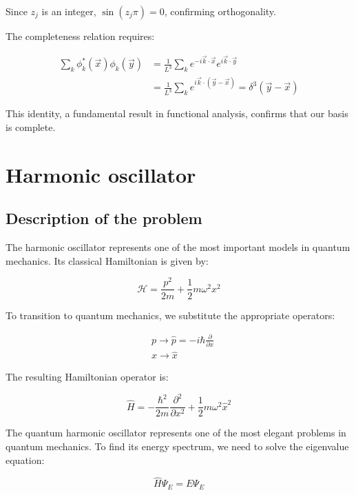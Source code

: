 \documentclass[italian]{HKNdocument}
\begin{document}
Since $z_j$ is an integer, $\sin(z_j\pi) = 0$, confirming orthogonality.

The completeness relation requires:

\begin{align}
\sum_k \phi_k^*(\vec{x})\phi_k(\vec{y}) &= \frac{1}{L^3}\sum_k e^{-i\vec{k}\cdot\vec{x}}e^{i\vec{k}\cdot\vec{y}} \\
&= \frac{1}{L^3}\sum_k e^{i\vec{k}\cdot(\vec{y}-\vec{x})} = \delta^3(\vec{y}-\vec{x}) \label{eq:4.41}
\end{align}

This identity, a fundamental result in functional analysis, confirms that our basis is complete.

\section{Harmonic oscillator}
\subsection{Description of the problem}

The harmonic oscillator represents one of the most important models in quantum mechanics. Its classical Hamiltonian is given by:

\begin{equation}
\mathcal{H} = \frac{p^2}{2m} + \frac{1}{2}m\omega^2 x^2 \label{eq:5.1}
\end{equation}

To transition to quantum mechanics, we substitute the appropriate operators:

\begin{align}
&p \longrightarrow \hat{p} = -i\hbar\frac{\partial}{\partial x} \label{eq:5.2} \\
&x \longrightarrow \hat{x}
\end{align}

The resulting Hamiltonian operator is:


\begin{equation}
\hat{H} = -\frac{\hbar^2}{2m}\frac{\partial^2}{\partial x^2} + \frac{1}{2}m\omega^2\hat{x}^2 \label{eq:5.3}
\end{equation}

The quantum harmonic oscillator represents one of the most elegant problems in quantum mechanics. To find its energy spectrum, we need to solve the eigenvalue equation:

\begin{equation}
\hat{H}\Psi_E = E\Psi_E \label{eq:5.4}
\end{equation}
\end{document}
